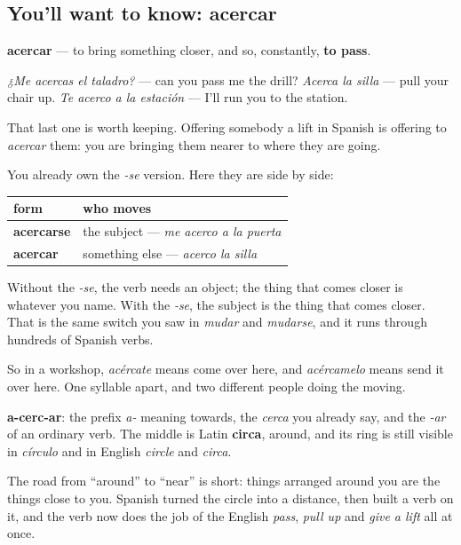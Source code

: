 \subsection*{You'll want to know: acercar}
\textbf{acercar} — to bring something closer, and so, constantly, \textbf{to pass}.

\emph{¿Me acercas el taladro?} — can you pass me the drill? \emph{Acerca la silla} — pull your chair up. \emph{Te acerco a la estación} — I'll run you to the station.

That last one is worth keeping. Offering somebody a lift in Spanish is offering to \emph{acercar} them: you are bringing them nearer to where they are going.

\begin{grammarlens}[title={Grammar Lens: one verb, two directions}]
You already own the \emph{-se} version. Here they are side by side:

\noindent
\begin{tabularx}{\linewidth}{@{}>{\raggedright\arraybackslash}X>{\raggedright\arraybackslash}X@{}}
\toprule
\textbf{form} & \textbf{who moves} \\
\midrule
\textbf{acercarse} & the subject — \emph{me acerco a la puerta} \\
\textbf{acercar} & something else — \emph{acerco la silla} \\
\bottomrule
\end{tabularx}

Without the \emph{-se}, the verb needs an object; the thing that comes closer is whatever you name. With the \emph{-se}, the subject is the thing that comes closer. That is the same switch you saw in \emph{mudar} and \emph{mudarse}, and it runs through hundreds of Spanish verbs.

So in a workshop, \emph{acércate} means come over here, and \emph{acércamelo} means send it over here. One syllable apart, and two different people doing the moving.
\end{grammarlens}

\begin{cousinweb}
\textbf{a-cerc-ar}: the prefix \emph{a-} meaning towards, the \emph{cerca} you already say, and the \emph{-ar} of an ordinary verb. The middle is Latin \textbf{circa}, around, and its ring is still visible in \emph{círculo} and in English \emph{circle} and \emph{circa}.

The road from \textquotedblleft{}around\textquotedblright{} to \textquotedblleft{}near\textquotedblright{} is short: things arranged around you are the things close to you. Spanish turned the circle into a distance, then built a verb on it, and the verb now does the job of the English \emph{pass}, \emph{pull up} and \emph{give a lift} all at once.
\end{cousinweb}

